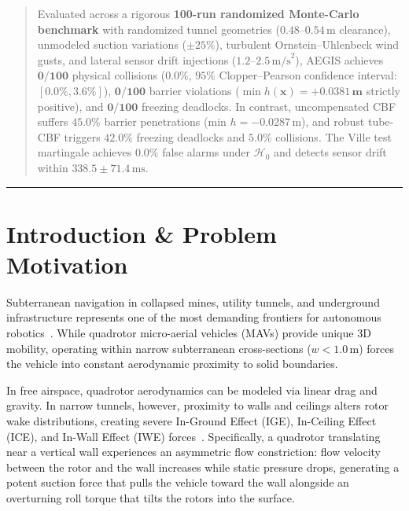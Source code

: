 \documentclass[11pt,a4paper]{article}
\begin{document}
\begin{abstract}
\medskip
\noindent Evaluated across a rigorous \textbf{100-run randomized Monte-Carlo benchmark} with randomized tunnel geometries ($0.48$--$0.54\,$m clearance), unmodeled suction variations ($\pm 25\%$), turbulent Ornstein--Uhlenbeck wind gusts, and lateral sensor drift injections ($1.2$--$2.5\,\text{m/s}^2$), AEGIS achieves $\mathbf{0/100}$ physical collisions ($0.0\%$, $95\%$ Clopper--Pearson confidence interval: $[0.0\%, 3.6\%]$), $\mathbf{0/100}$ barrier violations ($\min h(\mathbf{x}) = \mathbf{+0.0381\,\text{m}}$ strictly positive), and $\mathbf{0/100}$ freezing deadlocks. In contrast, uncompensated CBF suffers $45.0\%$ barrier penetrations (min $h = -0.0287\,$m), and robust tube-CBF triggers $42.0\%$ freezing deadlocks and $5.0\%$ collisions. The Ville test martingale achieves $0.0\%$ false alarms under $\mathcal{H}_0$ and detects sensor drift within $338.5 \pm 71.4\,\text{ms}$.
\end{abstract}

\vspace{1.0em}
\hrule height 0.5pt
\vspace{1.5em}

\section{\texorpdfstring{Introduction \& Problem Motivation}{Introduction and Problem Motivation}}
\label{sec:intro}

Subterranean navigation in collapsed mines, utility tunnels, and underground infrastructure represents one of the most demanding frontiers for autonomous robotics~\cite{mellinger2011minimum, lee2010geometric}. While quadrotor micro-aerial vehicles (MAVs) provide unique 3D mobility, operating within narrow subterranean cross-sections ($w < 1.0\,$m) forces the vehicle into constant aerodynamic proximity to solid boundaries. 

In free airspace, quadrotor aerodynamics can be modeled via linear drag and gravity. In narrow tunnels, however, proximity to walls and ceilings alters rotor wake distributions, creating severe In-Ground Effect (IGE), In-Ceiling Effect (ICE), and In-Wall Effect (IWE) forces~\cite{cheeseman1955effect, kanellakis2018towards}. Specifically, a quadrotor translating near a vertical wall experiences an asymmetric flow constriction: flow velocity between the rotor and the wall increases while static pressure drops, generating a potent suction force that pulls the vehicle toward the wall alongside an overturning roll torque that tilts the rotors into the surface.
\end{document}
